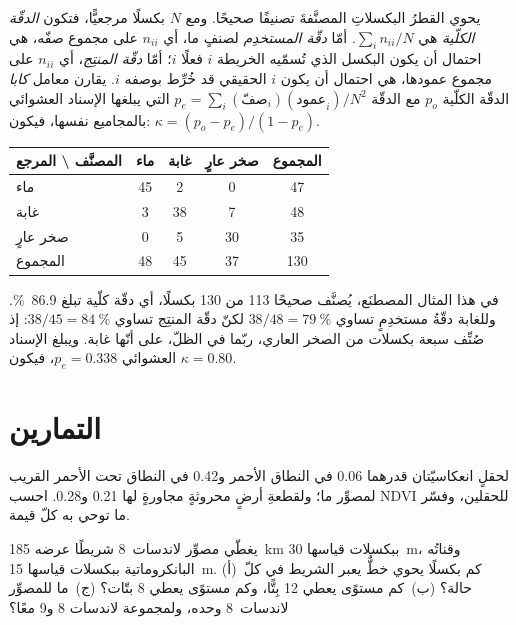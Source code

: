يحوي القطرُ البكسلاتِ المصنَّفةَ تصنيفًا صحيحًا. ومع $N$ بكسلًا مرجعيًّا،
فتكون \emph{الدقّة الكلّية} هي $\sum_i n_{ii}/N$. أمّا \emph{دقّة المستخدِم}
لصنفٍ ما، أي $n_{ii}$ على مجموع صفّه، هي احتمال أن يكون البكسل
الذي تُسمّيه الخريطة $i$ فعلًا $i$؛ أمّا \emph{دقّة المنتِج}، أي $n_{ii}$
على مجموع عمودها، هي احتمال أن يكون $i$ الحقيقي قد خُرِّط بوصفه $i$.
يقارن معامل \emph{كابا} الدقّة الكلّية $p_o$ مع الدقّة
$p_e = \sum_i (\text{صفّ}_i)(\text{عمود}_i)/N^2$ التي يبلغها الإسناد العشوائي
بالمجاميع نفسها، فيكون: $\kappa = (p_o - p_e)/(1 -
p_e)$.

\begin{center}
\small
\begin{tabular}{l|ccc|c}
\hline
المصنَّف \textbackslash{} المرجع & ماء & غابة & صخر عارٍ & المجموع \\
\hline
ماء & 45 & 2 & 0 & 47 \\
غابة & 3 & 38 & 7 & 48 \\
صخر عارٍ & 0 & 5 & 30 & 35 \\
\hline
المجموع & 48 & 45 & 37 & 130 \\
\hline
\end{tabular}
\end{center}

في هذا المثال المصطنَع، يُصنَّف صحيحًا 113 من 130 بكسلًا، أي دقّة كلّية
تبلغ \qty{86.9}{\percent}. وللغابة دقّةُ مستخدِمٍ تساوي
$38/48 = \qty{79}{\percent}$ لكنّ دقّة المنتِج تساوي $38/45 =
\qty{84}{\percent}$: إذ صُنِّف سبعة بكسلات من الصخر العاري، ربّما في الظلّ، على أنّها غابة.
ويبلغ الإسناد العشوائي $p_e = 0.338$، فيكون $\kappa =
0.80$.

\section{التمارين}

\begin{exercise}[$\star$]\label{exo:b3:remote-sensing-gis:1}
لحقلٍ انعكاسيّتان قدرهما 0.06 في النطاق الأحمر و0.42 في
النطاق تحت الأحمر القريب لمصوِّر ما؛ ولقطعةِ أرضٍ محروثةٍ مجاورةٍ لها 0.21
و0.28. احسب NDVI للحقلين، وفسّر ما توحي به كلّ قيمة.
\end{exercise}

\begin{exercise}[$\star$]\label{exo:b3:remote-sensing-gis:2}
يغطّي مصوِّر لاندسات~8 شريطًا عرضه \qty{185}{km} ببكسلات قياسها \qty{30}{m}،
وقناتُه البانكروماتية ببكسلات قياسها \qty{15}{m}. (أ)~كم بكسلًا يحوي خطٌّ يعبر الشريط
في كلّ حالة؟ (ب)~كم مستوًى يعطي 12 بِتًّا، وكم مستوًى يعطي 8 بتّات؟
(ج)~ما  للمصوِّر لاندسات~8
وحده، ولمجموعة لاندسات 8 و9 معًا؟
\end{exercise}

